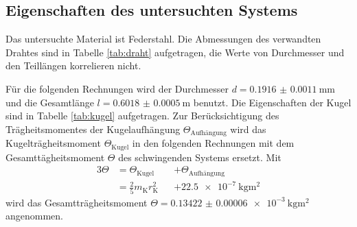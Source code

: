 \subsection{Eigenschaften des untersuchten Systems}
\label{sec:auswertung1}
Das untersuchte Material ist Federstahl.
Die Abmessungen des verwandten Drahtes sind in Tabelle \ref{tab:draht} aufgetragen, die Werte von Durchmesser und den Teillängen korrelieren nicht.
\begin{minipage}[t]{0.5\textwidth}

\end{minipage}
\begin{minipage}[t]{0.5\textwidth}

\end{minipage}
Für die folgenden Rechnungen wird der Durchmesser $d=\SI{0.1916(11)}{\milli\meter}$ und die Gesamtlänge $l=\SI{0.6018(5)}{\meter}$ benutzt.
\newpage
Die Eigenschaften der Kugel sind in Tabelle \ref{tab:kugel} aufgetragen.
Zur Berücksichtigung des Trägheitsmomentes der Kugelaufhängung $\Theta_\text{Aufhängung}$ wird das Kugelträgheitsmoment $\Theta_\text{Kugel}$ in den folgenden Rechnungen mit dem Gesamttägheitsmoment $\Theta$ des schwingenden Systems ersetzt.
Mit 
\begin{alignat}{3}
	\Theta	&=\Theta_\text{Kugel} &&+\Theta_\text{Aufhängung}\label{eq:gesamttraegheit}\\ 
		&=\frac{2}{5} m_\text{K} r_\text{K}^2 &&+\SI{22.5e-7}{\kilo\gram\meter\squared}
\end{alignat}
wird das Gesamtträgheitsmoment $\Theta=\SI{0.13422(6)e-3}{\kilo\gram\meter\squared}$ angenommen.
